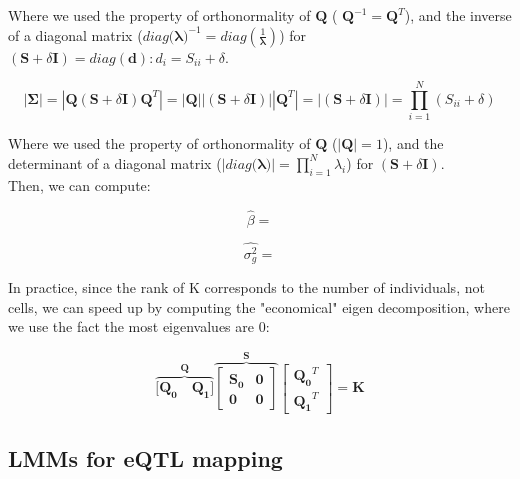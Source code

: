 Where we used the property of orthonormality of $\mathbf{Q}$ ( $\mathbf{Q}^{-1} = \mathbf{Q}^T$), and the inverse of a diagonal matrix ($diag(\boldsymbol{\lambda)}^{-1} = diag(\frac{1}{\boldsymbol{\lambda}})$) for $(\mathbf{S} + \delta\mathbf{I}) = diag(\mathbf{d}): d_i = S_{ii} + \delta$.

\begin{equation}
    |\boldsymbol{\Sigma}| = |\mathbf{Q} (\mathbf{S} + \delta\mathbf{I})\mathbf{Q}^T|= |\mathbf{Q}||(\mathbf{S} + \delta\mathbf{I})||\mathbf{Q}^T| = |(\mathbf{S} + \delta\mathbf{I})| =  \prod_{i=1}^{N} (S_{ii} + \delta)
\end{equation}

Where we used the property of orthonormality of $\mathbf{Q}$ ($|\mathbf{Q}| = 1$), and the determinant of a diagonal matrix ($|diag(\boldsymbol{\lambda)}| = \prod_{i=1}^{N} \lambda_i$) for $(\mathbf{S} + \delta\mathbf{I})$.\\

Then, we can compute:

\begin{equation}
    \hat{\beta} = 
\end{equation}

\begin{equation}
    \hat{\sigma_g^2} =
\end{equation}

In practice, since the rank of K corresponds to the number of individuals, not cells, we can speed up by computing the "economical" eigen decomposition, where we use the fact the most eigenvalues are 0:

\begin{equation}
    \overbrace{[\mathbf{Q_0} \quad \mathbf{Q_1]}}^{\mathbf{Q}}
            \overbrace{\left[\begin{array}{cc}
                \mathbf{S_0} & \mathbf{0}\\
                        \mathbf{0} & \mathbf{0}
            \end{array}\right]}^{\mathbf{S}}
        \left[\begin{array}{c}
            \mathbf{Q_0}^T \\
            \mathbf{Q_1}^T
        \end{array}\right] = \mathbf{K}
\end{equation}

\subsection{LMMs for eQTL mapping}

